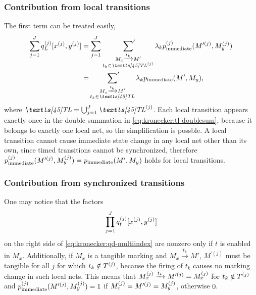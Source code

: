 \subsubsection{Contribution from local transitions}

The first term can be treated easily,
\begin{align}
   \sum_{j = 1}^J q_L\loc{j}[x\loc{j}, y\loc{j}] &= \sum_{j = 1}^J\,
  \sumprime_{\substack{M_x \xrightarrow{t_k} M' \\ t_k \in
  \TL\loc{j}}} \lambda_k p_{\text{immediate}}\loc{j}(M^{\prime(j)},
  M_y\loc{j}) \label{eq:kronecker:tl-doublesum}\\
  &= \sumprime_{\substack{M_x \xrightarrow{t_k} M' \\ t_k \in \TL}}
  \lambda_k p_{\text{immediate}}(M', M_y)
  \text, \label{eq:kronecker:tl-singlesum}
\end{align}
where $\TL = \bigcup_{j = 1}^J \TL\loc{j}$. Each local transition
appears exactly once in the double summation in
\cref{eq:kronecker:tl-doublesum}, because it belongs to exactly one
local net, so the simplification 
is possble. A local transition cannot cause immediate state change in
any local net other than its own, since timed transitions cannot be
synchronized, therefore
$p_{\text{immediate}}^{(j)}(M^{\prime(j)}, M_y^{(j)}) =
p_{\text{immediate}}(M', M_y)$ holds for local transitions.

\subsubsection{Contribution from synchronized transitions}

One may notice that the factors
\begin{equation}
  \prod_{j = 1}^J q_t^{(j)}[x^{(j)}, y^{(j)}]
\end{equation}
on the right side of \vref{eq:kronecker:qd-multiindex} are nonzero
only if $t$ is enabled in $M_x$. Additionally, if $M_x$ is a tangible
marking and $M_x \xrightarrow{t_k} M'$, $M^{\prime (j)}$ must be
tangible for all $j$ for which $t_k \notin T^{(j)}$, because the
firing of $t_k$ causes no marking change in such local nets. This means that
$M_x^{(j)} \xrightarrow{t_k} M^{\prime (j)} = M_x^{(j)}$ for
$t_k \notin T^{(j)}$ and
$p_{\text{immediate}}^{(j)}(M^{\prime (j)}, M_y^{(j)}) = 1$ if
$M_x^{(j)} = M^{\prime (j)} = M_y^{(j)}$, otherwise $0$.


